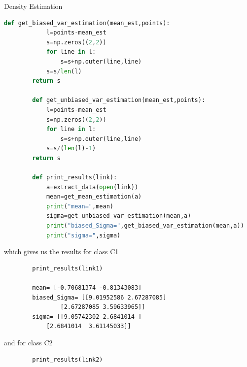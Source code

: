 \documentclass[
ngerman,
]{tudaexercise}
\begin{document}
\begin{task}{Density Estimation}
\begin{subtask}
\begin{lstlisting}[language=Python]
		def get_biased_var_estimation(mean_est,points):
			l=points-mean_est
			s=np.zeros((2,2))
			for line in l:
				s=s+np.outer(line,line)
			s=s/len(l)
		return s
		
		def get_unbiased_var_estimation(mean_est,points):
			l=points-mean_est
			s=np.zeros((2,2))
			for line in l:
				s=s+np.outer(line,line)
			s=s/(len(l)-1)
		return s
		
		def print_results(link):
			a=extract_data(open(link))
			mean=get_mean_estimation(a)
			print("mean=",mean)
			sigma=get_unbiased_var_estimation(mean,a)
			print("biased_Sigma=",get_biased_var_estimation(mean,a))
			print("sigma=",sigma)
		\end{lstlisting}
		which gives us the results for class C1
		\begin{lstlisting}
		print_results(link1)
		
		mean= [-0.70681374 -0.81343083]
		biased_Sigma= [[9.01952586 2.67287085]
				[2.67287085 3.59633965]]
		sigma= [[9.05742302 2.6841014 ]
			[2.6841014  3.61145033]]
		\end{lstlisting}
		and for class C2
		\begin{lstlisting}
		print_results(link2)
		

\end{lstlisting}
\end{subtask}
\end{task}
\end{document}
